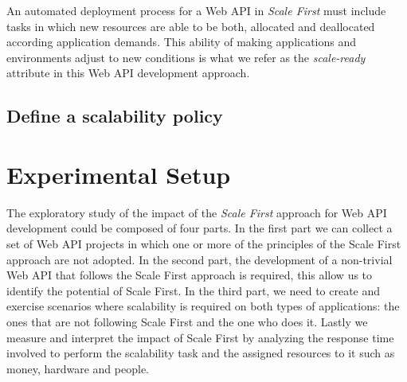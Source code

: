 \documentclass[10pt,article]{IEEEtran}
\begin{document}
An automated deployment process for a Web API in \textit{Scale First} must include tasks in which new resources are able to be both, allocated and deallocated according application demands. This ability of making applications and environments adjust to new conditions is what we refer as the \textit{scale-ready} attribute in this Web API development approach. 
 

\subsection{Define a scalability policy}
 


\ifCLASSOPTIONcompsoc
\else
    \section{Experimental Setup}
\label{sec:experimentals}
\fi

The exploratory study of the impact of the \textit{Scale First} approach for Web API development could be composed of four parts. In the first part we can collect a set of Web API projects in which one or more of the principles of the Scale First approach are not adopted. In the second part, the development of a non-trivial Web API that follows the Scale First approach is required, this allow us to identify the potential of Scale First. In the third part, we need to create and exercise scenarios where scalability is required on both types of applications: the ones that are not following Scale First and the one who does it. Lastly we measure and interpret the impact of Scale First by analyzing the response time involved to perform the scalability task and the assigned resources to it such as money, hardware and people. 


\end{document}
